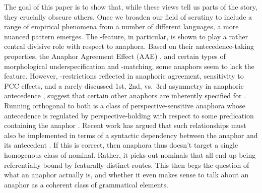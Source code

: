 \documentclass[output=paper, modfonts, nonflat]{langsci/langscibook}
\begin{document}
The goal of this paper is to show that, while these views tell us
parts of the story, they crucially obscure others. Once we broaden our
field of scrutiny to include a range of empirical phenomena from a
number of different languages, a more nuanced pattern emerges. The
\person-feature, in particular, is shown to play a rather central
divisive role with respect to anaphora. Based on their
antecedence-taking properties, the Anaphor Agreement Effect (AAE)
\citep{rizzi:1990}, and certain types of morphological
underspecification and \ph-matching, some anaphors seem to lack the
\person{} feature. However, \person-restrictions reflected in
anaphoric agreement, sensitivity to PCC effects, and a rarely
discussed 1st, 2nd, vs.\ 3rd asymmetry in anaphoric antecedence
\citep{comrie:1999}, suggest that certain other anaphors are
inherently specified for \person. Running orthogonal to both is a
class of perspective-sensitive anaphora \citep[including so-called
logophora][]{clements:1975} whose antecedence is regulated by
perspective-holding with respect to some predication containing the
anaphor \citep{sells:1987, kuno:1987, koopmansportiche:1989,
  giorgi:2010, pearson:2013}. Recent work has argued that such
relationships must also be implemented in terms of a syntactic
dependency between the anaphor and its antecedent
\citep{sundaresan:2012, pearson:2013, nishigauchi:2014,
  charnavel:2016}. If this is correct, then anaphora thus doesn't
target a single homogenous class of nominal. Rather, it picks out
nominals that all end up being referentially bound by featurally
distinct routes. This then begs the question of what an anaphor
actually is, and whether it even makes sense to talk about an anaphor
as a coherent class of grammatical elements.
\end{document}
